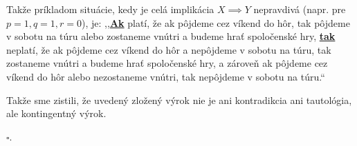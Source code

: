 \documentclass{article}
\begin{document}
\bigskip

Takže príkladom situácie, kedy je celá implikácia $X \implies Y$ nepravdivá (napr. pre $p=1, q=1, r=0$), je: 
,,\underline{\textbf{Ak}} platí, že ak pôjdeme cez víkend do hôr, tak pôjdeme v sobotu na túru alebo zostaneme vnútri a budeme hrať spoločenské hry, \underline{\textbf{tak}} neplatí, že ak pôjdeme cez víkend do hôr a nepôjdeme v sobotu na túru, tak zostaneme vnútri a budeme hrať spoločenské hry, a zároveň ak pôjdeme cez víkend do hôr alebo nezostaneme vnútri, tak nepôjdeme v sobotu na túru.“

\begin{center}Takže sme zistili, že uvedený zložený výrok nie je ani kontradikcia ani tautológia, ale kontingentný výrok.
\end{center}
\bigskip
\hfill $\square$.
\end{document}
